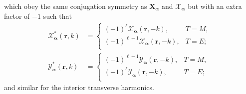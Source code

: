 \documentclass{article}
\numberwithin{equation}{section}
\begin{document}
which obey the same conjugation symmetry as $\mathbf{X}_{\bm{\alpha}}$ and $\bm{\mathcal{X}}_{\bm{\alpha}}$ but with an extra factor of $-1$ such that
\begin{equation}
\begin{split}
\bm{\mathcal{X}}_{\bm{\alpha}}^*(\mathbf{r},k) &= 
\begin{cases}
(-1)^{\ell}\bm{\mathcal{X}}_{\bm{\alpha}}(\mathbf{r},-k), & T = M,\\
(-1)^{\ell + 1}\bm{\mathcal{X}}_{\bm{\alpha}}(\mathbf{r},-k), & T = E;\\
\end{cases}\\
\bm{\mathcal{Y}}_{\bm{\alpha}}^*(\mathbf{r},k) &= 
\begin{cases}
(-1)^{\ell + 1}\bm{\mathcal{Y}}_{\bm{\alpha}}(\mathbf{r},-k), & T = M,\\
(-1)^{\ell}\bm{\mathcal{Y}}_{\bm{\alpha}}(\mathbf{r},-k), & T = E;\\
\end{cases}
\end{split}
\end{equation}
and similar for the interior transverse harmonics.
\end{document}
